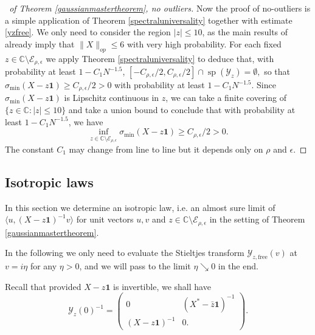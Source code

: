 \documentclass[11pt,reqno]{amsart}
\theoremstyle{plain}
\theoremstyle{remark}
\numberwithin{equation}{section}
\begin{document}
\begin{proof}[\proofname\ of Theorem \ref{gaussianmastertheorem}, no outliers] Now the proof of no-outliers is a simple application of Theorem \ref{spectraluniversality} together with estimate \eqref{yzfree}. We only need to consider the region $|z|\leq 10$, as the main results of \cite{bandeira2023matrix} already imply that $\|X\|_{op}\leq 6$ with very high probability. For each fixed $z\in\mathbb{C}\setminus\mathcal{E}_{\rho,\epsilon}$ we apply Theorem \ref{spectraluniversality} to deduce that, with probability at least $1-C_1N^{-1.5}$, $[-C_{\rho,\epsilon}/2,C_{\rho,\epsilon}/2]\cap\operatorname{sp}(\mathcal{Y}_z)=\emptyset,$ so that $\sigma_{\min}(X-z\mathbf{1})\geq C_{\rho,\epsilon}/2>0$ with probability at least $1-C_1N^{-1.5}$. Since $\sigma_{\min}(X-z\mathbf{1})$ is Lipschitz continuous in $z$, we can take a finite covering of $\{z\in\mathbb{C}:|z|\leq 10\}$ and take a union bound to conclude that with probability at least $1-C_1N^{-1.5}$, we have \begin{equation}\label{singularsupports}
\inf_{z\in\mathbb{C}\setminus\mathcal{E}_{\rho,\epsilon}}\sigma_{\min}(X-z\mathbf{1})\geq C_{\rho,\epsilon}/2>0.\end{equation} 
    The constant $C_1$ may change from line to line but it depends only on $\rho$ and $\epsilon$.
\end{proof}


\subsection{Isotropic laws}

In this section we determine an isotropic law, i.e. an almost sure limit of $\langle u,(X-z\mathbf{1})^{-1}v\rangle$ for unit vectors $u,v$ and $z\in\mathbb{C}\setminus\mathcal{E}_{\rho,\epsilon}$ in the setting of Theorem \ref{gaussianmastertheorem}.

In the following we only need to evaluate the Stieltjes transform $\mathcal{Y}_{z,\text{free}}(v)$ at $v=i\eta$ for any $\eta>0$, and we will pass to the limit $\eta\searrow 0$ in the end.


Recall that provided $X-z\mathbf{1}$ is invertible, we shall have \begin{equation}\label{yzoyzo}\mathcal{Y}_z(0)^{-1}=\begin{pmatrix}0&({X^*}-\bar{z}\mathbf{1})^{-1}\\(X-z\mathbf{1})^{-1}&0.
\end{pmatrix}.\end{equation} 
\end{document}
